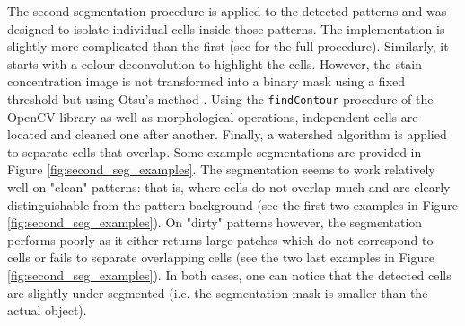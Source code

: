 The second segmentation procedure is applied to the detected patterns and was designed to isolate individual cells inside those patterns. The implementation is slightly more complicated than the first (see \cite{adeblire2013} for the full procedure). Similarly, it starts with a colour deconvolution to highlight the cells. However, the stain concentration image is not transformed into a binary mask using a fixed threshold but using Otsu's method \cite{otsu1975threshold}. Using the \texttt{findContour} procedure of the OpenCV library as well as morphological operations, independent cells are located and cleaned one after another. Finally, a watershed algorithm is applied to separate cells that overlap. Some example segmentations are provided in Figure \ref{fig:second_seg_examples}. The segmentation seems to work relatively well on "clean" patterns: that is, where cells do not overlap much and are clearly distinguishable from the pattern background (see the first two examples in Figure \ref{fig:second_seg_examples}). On "dirty" patterns however, the segmentation performs poorly as it either returns large patches which do not correspond to cells or fails to separate overlapping cells (see the two last examples in Figure \ref{fig:second_seg_examples}). In both cases, one can notice that the detected cells are slightly under-segmented (i.e. the segmentation mask is smaller than the actual object).

